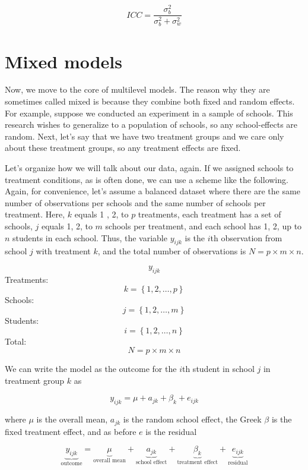 \begin{equation}\label{ICC}
  ICC = \frac{\sigma_b^2}{\sigma_b^2+\sigma_w^2}
\end{equation}

\section{Mixed models}

Now, we move to the core of multilevel models. The reason why they are sometimes called mixed is because they combine both fixed and random effects. For example, suppose we conducted an experiment in a sample of schools. This research wishes to generalize to a population of schools, so any school-effects are random. Next, let's say that we have two treatment groups and we care only about these treatment groups, so any treatment effects are fixed.

Let's organize how we will talk about our data, again. If we assigned schools to treatment conditions, as is often done, we can use a scheme like the following. Again, for convenience, let's assume a balanced dataset where there are the same number of observations per schools and the same number of schools per treatment. Here, $k$ equals 1 , 2, to $p$ treatments, each treatment has a set of schools, $j$ equals 1, 2, to $m$ schools per treatment, and each school has 1, 2, up to $n$ students in each school. Thus, the variable $y_{ijk}$ is the $i$th observation from school $j$ with treatment $k$, and the total number of observations is $N = p \times m \times n$.

\[
y_{ijk}
\]
Treatments:
\[
k = \left\{1,2,\dots,p\right\}
\]
Schools:
\[
j = \left\{1,2,\dots,m\right\}
\]
Students:
\[
i = \left\{1,2,\dots,n\right\}
\]
Total:
\[
N = p \times m\times n
\]

We can write the model as the outcome for the $i$th student in school $j$ in treatment group $k$ as

\begin{equation}
  y_{ijk} = \mu + a_{jk} + \beta_k + e_{ijk}
\end{equation}

where $\mu$ is the overall mean, $a_{jk}$ is the random school effect, the Greek $\beta$ is the fixed treatment effect, and as before $e$ is the residual

\[
\underbrace{y_{ijk}}_{\text{outcome}} = \underbrace{\mu}_{\text{overall mean}} + \underbrace{a_{jk}}_{\text{school effect}}+\underbrace{\beta_k}_{\text{treatment effect}}+
	\underbrace{e_{ijk}}_{\text{residual}}
\]


